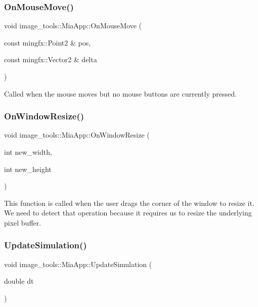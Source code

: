 \subsubsection{\texorpdfstring{On\+Mouse\+Move()}{OnMouseMove()}}
{\footnotesize\ttfamily void image\+\_\+tools\+::\+Mia\+App\+::\+On\+Mouse\+Move (\begin{DoxyParamCaption}\item[{const mingfx\+::\+Point2 \&}]{pos,  }\item[{const mingfx\+::\+Vector2 \&}]{delta }\end{DoxyParamCaption})\hspace{0.3cm}{\ttfamily [override]}}

Called when the mouse moves but no mouse buttons are currently pressed. \mbox{\label{classimage__tools_1_1MiaApp_a81597364eeca01df8e26cfb6bf037ffe}} 
\subsubsection{\texorpdfstring{On\+Window\+Resize()}{OnWindowResize()}}
{\footnotesize\ttfamily void image\+\_\+tools\+::\+Mia\+App\+::\+On\+Window\+Resize (\begin{DoxyParamCaption}\item[{int}]{new\+\_\+width,  }\item[{int}]{new\+\_\+height }\end{DoxyParamCaption})\hspace{0.3cm}{\ttfamily [override]}}

This function is called when the user drags the corner of the window to resize it. We need to detect that operation because it requires us to resize the underlying pixel buffer. \mbox{\label{classimage__tools_1_1MiaApp_a601e7b8b38ca77b8c6bf81b421fda18b}} 
\subsubsection{\texorpdfstring{Update\+Simulation()}{UpdateSimulation()}}
{\footnotesize\ttfamily void image\+\_\+tools\+::\+Mia\+App\+::\+Update\+Simulation (\begin{DoxyParamCaption}\item[{double}]{dt }\end{DoxyParamCaption})\hspace{0.3cm}{\ttfamily [override]}}

